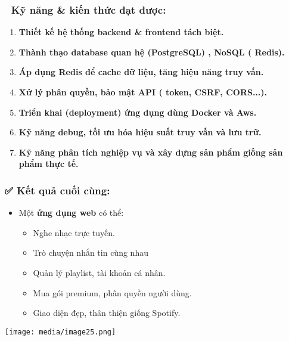 \documentclass{article}
\begin{document}
\subsubsection{\texorpdfstring{\textbf{🧠 Kỹ năng \& kiến thức đạt
được:}}{🧠 Kỹ năng \& kiến thức đạt được:}}\label{kux1ef9-nux103ng-kiux1ebfn-thux1ee9c-ux111ux1ea1t-ux111ux1b0ux1ee3c}

\begin{enumerate}
\def\labelenumi{\arabic{enumi}.}
\item
  \textbf{Thiết kế hệ thống backend \& frontend tách biệt.}
\item
  \textbf{Thành thạo database quan hệ (PostgreSQL) , NoSQL ( Redis).\\
  }
\item
  \textbf{Áp dụng Redis để cache dữ liệu, tăng hiệu năng truy vấn.\\
  }
\item
  \textbf{Xử lý phân quyền, bảo mật API ( token, CSRF, CORS...).\\
  }
\item
  \textbf{Triển khai (deployment) ứng dụng dùng Docker và Aws.\\
  }
\item
  \textbf{Kỹ năng debug, tối ưu hóa hiệu suất truy vấn và lưu trữ.\\
  }
\item
  \textbf{Kỹ năng phân tích nghiệp vụ và xây dựng sản phẩm giống sản
  phẩm thực tế.\\
  }
\end{enumerate}

\subsubsection{\texorpdfstring{\textbf{✅ Kết quả cuối
cùng:}}{✅ Kết quả cuối cùng:}}\label{kux1ebft-quux1ea3-cuux1ed1i-cuxf9ng}

\begin{itemize}
\item
  Một \textbf{ứng dụng web} có thể:

  \begin{itemize}
  \item
    Nghe nhạc trực tuyến.
  \item
    Trò chuyện nhắn tin cùng nhau
  \item
    Quản lý playlist, tài khoản cá nhân.
  \item
    Mua gói premium, phân quyền người dùng.
  \item
    Giao diện đẹp, thân thiện giống Spotify.
  \end{itemize}
\end{itemize}

\texttt{[image: media/image25.png]}
\end{document}

